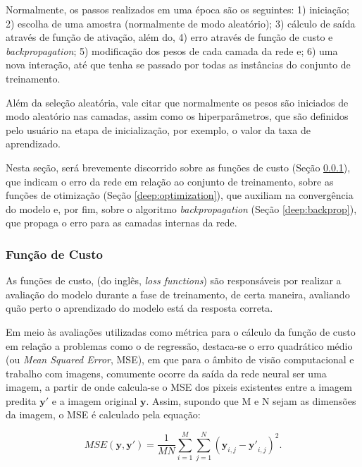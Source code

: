 Normalmente, os passos realizados em uma época são os seguintes: 1) iniciação; 2) escolha de uma amostra (normalmente de modo aleatório); 3) cálculo de saída através de função de ativação, além do, 4) erro através de função de custo e \textit{backpropagation}; 5) modificação dos pesos de cada camada da rede e; 6) uma nova interação, até que tenha se passado por todas as instâncias do conjunto de treinamento.

Além da seleção aleatória, vale citar que normalmente os pesos são iniciados de modo aleatório nas camadas, assim como os hiperparâmetros, que são definidos pelo usuário na etapa de inicialização, por exemplo, o valor da taxa de aprendizado.

Nesta seção, será brevemente discorrido sobre as funções de custo (Seção \ref{deep:cust}), que indicam o erro da rede em relação ao conjunto de treinamento, sobre as funções de otimização (Seção \ref{deep:optimization}), que auxiliam na convergência do modelo e, por fim, sobre o algoritmo \textit{backpropagation} (Seção \ref{deep:backprop}), que propaga o erro para as camadas internas da rede.


\subsubsection{Função de Custo}
\label{deep:cust}

As funções de custo, (do inglês, \textit{loss functions}) são responsáveis por realizar a avaliação do modelo durante a fase de treinamento, de certa maneira, avaliando quão perto o aprendizado do modelo está da resposta correta.

Em meio às avaliações utilizadas como métrica para o cálculo da função de custo em relação a problemas como o de regressão, destaca-se o erro quadrático médio (ou \textit{Mean Squared Error}, MSE)\citep{Wang2004}, em que para o âmbito de visão computacional e trabalho com imagens, comumente ocorre da saída da rede neural ser uma imagem, a partir de onde calcula-se o MSE dos pixeis existentes entre a imagem predita $\boldsymbol{y'}$ e a imagem original $\boldsymbol{y}$. Assim, supondo que M e N sejam as dimensões da imagem, o MSE é calculado pela equação:

\begin{equation}
    \label{deep:eq:9}
    MSE(\boldsymbol{y}, \boldsymbol{y'}) = \frac{1}{MN} \sum_{i=1}^{M} \sum_{j=1}^{N} (\boldsymbol{y}_{i,j} - \boldsymbol{y'}_{i,j})^2.
\end{equation}

